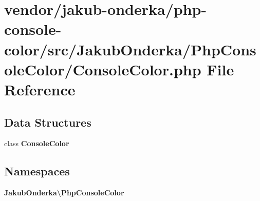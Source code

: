 \section{vendor/jakub-\/onderka/php-\/console-\/color/src/\+Jakub\+Onderka/\+Php\+Console\+Color/\+Console\+Color.php File Reference}
\label{_console_color_8php}
\subsection*{Data Structures}
\begin{DoxyCompactItemize}
\item 
class {\bf Console\+Color}
\end{DoxyCompactItemize}
\subsection*{Namespaces}
\begin{DoxyCompactItemize}
\item 
 {\bf Jakub\+Onderka\textbackslash{}\+Php\+Console\+Color}
\end{DoxyCompactItemize}

